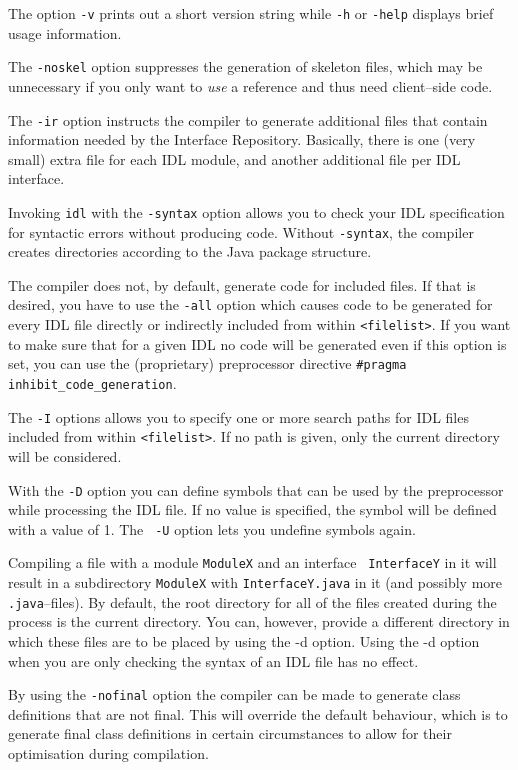 \documentclass[12pt]{scrbook}
\begin{document}
The option {\tt  -v} prints out a short version  string while {\tt -h}
or {\tt -help} displays brief usage information.

The {\tt -noskel} option suppresses the generation of skeleton files,
which may be unnecessary if you only want to {\em use} a reference and
thus need client--side code.

The  {\tt -ir} option  instructs the  compiler to  generate additional
files   that    contain   information   needed    by   the   Interface
Repository. Basically, there  is one (very small) extra  file for each
IDL module, and another additional file per IDL interface.

Invoking {\tt idl}  with the {\tt -syntax} option  allows you to check
your IDL  specification for  syntactic errors without  producing code.
Without {\tt  -syntax}, the compiler creates  directories according to
the Java package structure.

The  compiler  does  not,  by  default,  generate  code  for  included
files. If that is desired, you have to use the {\tt -all} option which
causes code to be generated  for every IDL file directly or indirectly
included from within  {\tt <filelist>}. If you want  to make sure that
for a given IDL no code will  be generated even if this option is set,
you  can use  the  (proprietary) preprocessor  directive {\tt \#pragma
inhibit\_code\_generation}.

The {\tt-I} options allows you to specify one or more search paths for
IDL files included from within  {\tt <filelist>}. If no path is given,
only the  current directory will  be considered.

With the  {\tt -D} option you can  define symbols that can  be used by
the  preprocessor while  processing  the  IDL file.   If  no value  is
specified, the  symbol will be  defined with a  value of 1. The {\tt
  -U} option lets you undefine symbols again.

Compiling a  file with  a module {\tt  ModuleX} and an  interface {\tt
  InterfaceY} in it  will result in a subdirectory  {\tt ModuleX} with
  {\tt    InterfaceY.java}   in   it    (and   possibly    more   {\tt
  .java}--files). By default, the root  directory for all of the files
  created  during  the process  is  the  current  directory. You  can,
  however, provide a  different directory in which these  files are to
  be placed by  using the -d option. Using the -d  option when you are
  only checking the syntax of an IDL file has no effect.

By using the {\tt -nofinal} option the compiler can be made to generate
class definitions that are not final. This will override the default
behaviour, which is to generate final class definitions in certain
circumstances to allow for their optimisation during compilation.
\end{document}
